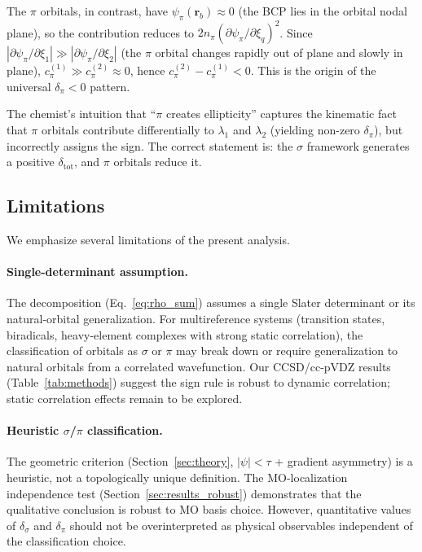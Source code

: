 \documentclass[twoside,natbib]{svjour3}
\newcommand{\delsg}{\delta_{\sigma}}
\newcommand{\delpi}{\delta_{\pi}}
\begin{document}
The $\pi$ orbitals, in contrast, have $\psi_\pi(\mathbf{r}_b) \approx 0$
(the BCP lies in the orbital nodal plane), so the contribution
reduces to $2 n_\pi (\partial \psi_\pi / \partial \xi_q)^2$. Since
$|\partial \psi_\pi / \partial \xi_1| \gg |\partial \psi_\pi / \partial \xi_2|$
(the $\pi$ orbital changes rapidly out of plane and slowly in
plane), $c_\pi^{(1)} \gg c_\pi^{(2)} \approx 0$, hence
$c_\pi^{(2)} - c_\pi^{(1)} < 0$. This is the origin of the universal
$\delpi < 0$ pattern.

The chemist's intuition that ``$\pi$ creates ellipticity'' captures
the kinematic fact that $\pi$ orbitals contribute differentially to
$\lambda_1$ and $\lambda_2$ (yielding non-zero $\delpi$), but
incorrectly assigns the sign. The correct statement is: the
$\sigma$ framework generates a positive $\delta_{\text{tot}}$,
and $\pi$ orbitals reduce it.

\subsection{Limitations}

We emphasize several limitations of the present analysis.

\paragraph{Single-determinant assumption.}
The decomposition (Eq.~\ref{eq:rho_sum}) assumes a single Slater
determinant or its natural-orbital generalization. For
multireference systems (transition states, biradicals,
heavy-element complexes with strong static correlation), the
classification of orbitals as $\sigma$ or $\pi$ may break down
or require generalization to natural orbitals from a
correlated wavefunction. Our CCSD/cc-pVDZ results
(Table~\ref{tab:methods}) suggest the sign rule is robust to
dynamic correlation; static correlation effects remain to be
explored.

\paragraph{Heuristic $\sigma$/$\pi$ classification.}
The geometric criterion (Section~\ref{sec:theory}, $|\psi| < \tau$
+ gradient asymmetry) is a heuristic, not a topologically
unique definition. The MO-localization independence test
(Section~\ref{sec:results_robust}) demonstrates that the
qualitative conclusion is robust to MO basis choice. However,
quantitative values of $\delsg$ and $\delpi$ should not be
overinterpreted as physical observables independent of the
classification choice.
\end{document}
